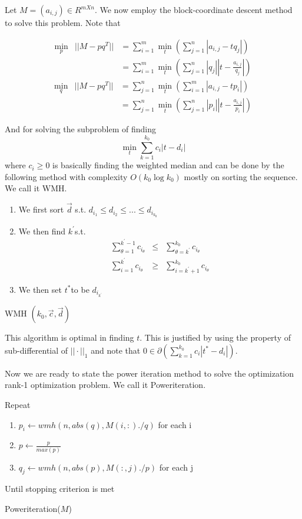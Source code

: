 \documentclass{../common/projectreport}
\begin{document}
Let $M=(a_{i,j})\in R^{mXn}$. We now employ the block-coordinate descent method to solve this problem. Note that 

\begin{eqnarray}
\min_{p} & ||M-pq^{T}|| & =\sum_{i=1}^{m}\min_{t}(\sum_{j=1}^{n}|a_{i,j}-tq_{j}|)\\
 &  & =\sum_{i=1}^{m}\min_{t}(\sum_{j=1}^{n}|q_{j}||t-\frac{a_{i,j}}{q_{j}}|)\nonumber 
\end{eqnarray}
\begin{eqnarray}
\min_{q} & ||M-pq^{T}|| & =\sum_{j=1}^{n}\min_{t}(\sum_{i=1}^{m}|a_{i,j}-tp_{i}|)\\
 &  & =\sum_{j=1}^{n}\min_{t}(\sum_{j=1}^{n}|p_{i}||t-\frac{a_{i,j}}{p_{i}}|)\nonumber 
\end{eqnarray}


And for solving the subproblem of finding 
\[
\min_{t}\sum_{k=1}^{k_{0}}c_{i}|t-d_{i}|
\]
where $c_{i}\ge0$ is basically finding the weighted median and can be done by the following method with complexity $O(k_{0}\log k_{0})$ mostly on sorting the sequence. We call it WMH.

\begin{algorithm}[tbh]
\begin{enumerate}
\item We first sort $\vec{\ensuremath{d}}$ s.t. $d_{i_{1}}\le d_{i_{2}}\le...\le d_{i_{k_{0}}}$ 
\item We then find $k^{'}$s.t. 
\begin{eqnarray*}
\sum_{\theta=1}^{k^{'}-1}c_{i_{\theta}} & \le & \sum_{\theta=k^{'}}^{k_{0}}c_{i_{\theta}}\\
\sum_{i=1}^{k^{'}}c_{i_{\theta}} & \ge & \sum_{i=k^{'}+1}^{k_{0}}c_{i_{\theta}}
\end{eqnarray*}

\item We then set $t^{*}$to be $d_{i_{k^{'}}}$
\end{enumerate}
\caption{WMH $(k_{0},\vec{c},\vec{d})$}
\end{algorithm}


This algorithm is optimal in finding $t$. This is justified by using the property of sub-differential of $||\cdot||_{1}$ and note that $0\in\partial(\sum_{k=1}^{k_{0}}c_{i}|t^{*}-d_{i}|)$. 

Now we are ready to state the power iteration method to solve the optimization rank-1 optimization problem. We call it Poweriteration.

\begin{algorithm}[tbh]
Repeat
\begin{enumerate}
\item $p_{i}\leftarrow wmh(n,abs(q),M(i,:)./q)$ for each i
\item $p\leftarrow\frac{p}{max(p)}$
\item $q_{j}\leftarrow wmh(n,abs(p),M(:,j)./p)$ for each j
\end{enumerate}
Until stopping criterion is met

\caption{Poweriteration($M$)}
\end{algorithm}
\end{document}
